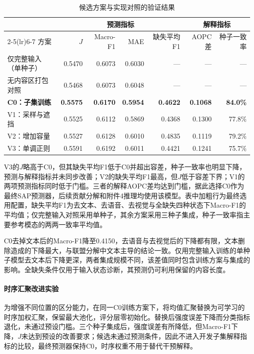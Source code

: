 \begin{table}[H]\centering\small
\caption{候选方案与实现对照的验证结果}\label{q3:tab:ablation}
\begin{tabular}{lrrrrrr}\toprule
& \multicolumn{4}{c}{预测指标} & \multicolumn{2}{c}{解释指标}\\
\cmidrule(lr){2-5}\cmidrule(lr){6-7}
方案 & $J$ & Macro-F1 & MAE & 缺失平均F1 & AOPC差 & 种子一致率\\\midrule
仅完整输入（单种子） & 0.5470 & 0.6073 & 0.6030 & --- & --- & --- \\
无内容区打包对照 & 0.5468 & 0.6073 & 0.6048 & --- & --- & --- \\
\textbf{C0：子集训练} & \textbf{0.5575} & \textbf{0.6170} & \textbf{0.5954} & \textbf{0.4622} & \textbf{0.1068} & \textbf{84.0\%} \\
V1：采样与遮挡 & 0.5525 & 0.6112 & 0.5869 & 0.4368 & 0.1300 & 77.8\% \\
V2：增加容量 & 0.5527 & 0.6128 & 0.6010 & 0.4835 & 0.1119 & 79.2\% \\
V3：单调正则 & 0.5591 & 0.6192 & 0.6011 & 0.4421 & 0.1241 & 75.7\% \\
\bottomrule\end{tabular}\end{table}
V3的$J$略高于C0，但其缺失平均F1低于C0并超出容差，种子一致率也明显下降，预测与解释指标并未同步改善；V2的缺失平均F1最高，但$J$低于容差下界；V1的两项预测指标同时低于门槛。三者的解释AOPC差均达到门槛，据此选择C0作为最终SAP预测器，后续贡献分解和附件4推理均使用该模型。表中加粗行为最终选用配置，缺失平均F1为去文本、去语音、去视觉与全缺失四种状态下Macro-F1的平均值；仅完整输入对照采用单种子，其余方案采用三种子集成，种子一致率指主要参考模态的两两一致率平均值。

C0去掉文本后的Macro-F1降至0.4150，去语音与去视觉后的下降都有限，文本删除造成的下降最大，与联盟分解中文本主导的结论一致。仅用完整输入训练的单种子模型去文本后下降更深，两者集成规模不同，该差值同时包含训练方案与集成的影响。全缺失条件仅用于输入状态诊断，其预测仍可利用保留的内容长度。

\FloatBarrier
\paragraph{时序汇聚改进实验}
为增强不同位置的区分能力，在同一C0训练方案下，将均值汇聚替换为可学习的时序加权汇聚，保留最大池化，评分层零初始化。替换后强度误差下降而分类指标退化，未通过预设门槛。三个种子集成后，强度误差有所降低，但Macro-F1下降，$J$未达到预设的改善要求；候选未通过预测条件，因此不进入开发子集解释指标的比较，最终预测器保持C0，时序权重不用于替代干预解释。

